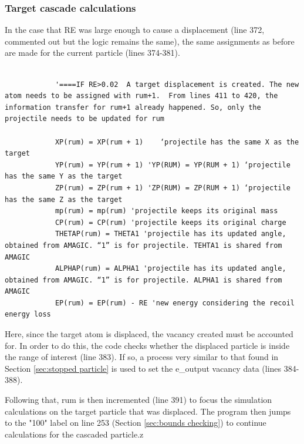 \documentclass[10pt, reqno]{exam}
\begin{document}
\subsubsection{Target cascade calculations}

In the case that RE was large enough to cause a displacement (line 372, commented out but the logic remains the same), the same assignments as before are made for the current particle (lines 374-381). \par

\begin{verbatim}   

            '====IF RE>0.02  A target displacement is created. The new atom needs to be assigned with rum+1.  From lines 411 to 420, the information transfer for rum+1 already happened. So, only the projectile needs to be updated for rum
    
            XP(rum) = XP(rum + 1)    ‘projectile has the same X as the target
            YP(rum) = YP(rum + 1) 'YP(RUM) = YP(RUM + 1) ‘projectile has the same Y as the target
            ZP(rum) = ZP(rum + 1) 'ZP(RUM) = ZP(RUM + 1) ‘projectile has the same Z as the target
            mp(rum) = mp(rum) 'projectile keeps its original mass
            CP(rum) = CP(rum) 'projectile keeps its original charge
            THETAP(rum) = THETA1 'projectile has its updated angle, obtained from AMAGIC. “1” is for projectile. TEHTA1 is shared from AMAGIC
            ALPHAP(rum) = ALPHA1 'projectile has its updated angle, obtained from AMAGIC. “1” is for projectile. ALPHA1 is shared from AMAGIC
            EP(rum) = EP(rum) - RE 'new energy considering the recoil energy loss
\end{verbatim}

Here, since the target atom is displaced, the vacancy created must be accounted for. In order to do this, the code checks whether the displaced particle is inside the range of interest (line 383). If so, a process very similar to that found in Section \ref{sec:stopped particle} is used to set the e\_output vacancy data (lines 384-388). \par

Following that, rum is then incremented (line 391) to focus the simulation calculations on the target particle that was displaced. The program then jumps to the "100" label on line 253 (Section \ref{sec:bounds checking}) to continue calculations for the cascaded particle.z
\end{document}
